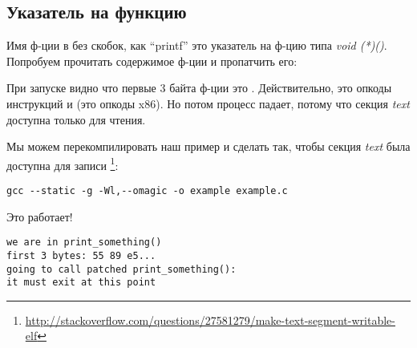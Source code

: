 \subsection{Указатель на функцию}

Имя ф-ции в \CCpp{} без скобок, как ``printf'' это указатель на ф-цию типа \emph{void (*)()}.
Попробуем прочитать содержимое ф-ции и пропатчить его:



При запуске видно что первые 3 байта ф-ции это .
Действительно, это опкоды инструкций  и  (это опкоды x86).
Но потом процесс падает, потому что секция \emph{text} доступна только для чтения.

Мы можем перекомпилировать наш пример и сделать так, чтобы секция \emph{text} была доступна для записи
\footnote{\url{http://stackoverflow.com/questions/27581279/make-text-segment-writable-elf}}:

\begin{lstlisting}
gcc --static -g -Wl,--omagic -o example example.c
\end{lstlisting}

Это работает!

\begin{lstlisting}
we are in print_something()
first 3 bytes: 55 89 e5...
going to call patched print_something():
it must exit at this point
\end{lstlisting}


